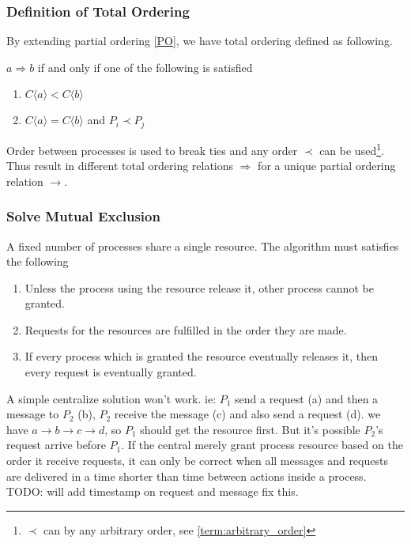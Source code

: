\documentclass[12pt,a4paper,oneside]{article}
\begin{document}
\subsubsection{Definition of Total Ordering} \label{s:TO:s:DTO}

By extending partial ordering \ref{PO}, we have total ordering defined as following.

\medskip

$a \Rightarrow b$ if and only if one of the following is satisfied

\begin{enumerate}
  \item $C\langle a \rangle < C\langle b \rangle$
  \item $C\langle a \rangle = C\langle b \rangle$ and $P_i \prec P_j$
\end{enumerate}

Order between processes is used to break ties and any order $\prec$ can be used\footnote{$\prec$ can by any arbitrary order, see \ref{term:arbitrary_order}}.
Thus result in different total ordering relations $\Rightarrow$ for a unique partial ordering relation $\rightarrow$.


\subsubsection{Solve Mutual Exclusion} \label{s:TO:s:ME}

A fixed number of processes share a single resource. The algorithm must satisfies the following

\begin{enumerate}
  \item Unless the process using the resource release it, other process cannot be granted.
  \item Requests for the resources are fulfilled in the order they are made.
  \item If every process which is granted the resource eventually releases it, then every request is eventually granted\cite{l}.
\end{enumerate}

A simple centralize solution won't work. ie: $P_1$ send a request (a) and then a message to $P_2$ (b), $P_2$ receive the message (c) and also send a request (d).
we have $a \rightarrow b \rightarrow c \rightarrow d$, so $P_1$ should get the resource first. But it's possible $P_2$'s request arrive before $P_1$.
If the central merely grant process resource based on the order it receive requests, it can only be correct when all messages and requests are delivered in a time
shorter than time between actions inside a process.
TODO: will add timestamp on request and message fix this.
\end{document}
